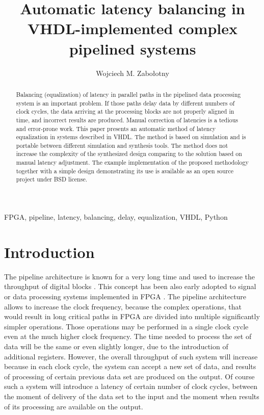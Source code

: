 \documentclass[preprint,11pt]{elsarticle}
\newcommand{\wzcite}[1]{ \cite{#1}}
\begin{document}
\sloppy
\begin{frontmatter}
\title{Automatic latency balancing in VHDL-implemented complex pipelined systems}
\author{Wojciech M. Zabołotny}
\address{Institute of Electronic Systems, Warsaw University of Technology,
 ul. Nowowiejska 15/19, 00-665 Warszawa, Poland}
 \begin{abstract}
 Balancing (equalization) of latency in parallel paths in the pipelined data processing system is an important problem.
 If those paths delay data by different numbers of clock cycles, the data arriving at the processing blocks 
 are not properly aligned in time, and incorrect results are produced. Manual correction of latencies is
 a tedious and error-prone work. This paper presents an automatic method of
 latency equalization in systems described in VHDL.
 The method is based on simulation and is portable between different simulation
 and synthesis tools. The method does not increase the complexity of the synthesized design
 comparing to the solution based on manual latency adjustment.
 The example implementation of the proposed methodology together with a simple design
 demonstrating its use is available as an open source project under BSD license.
 \end{abstract}
\begin{keyword}
FPGA, pipeline, latency, balancing, delay, equalization, VHDL, Python
\end{keyword}
\end{frontmatter}
 \section{Introduction}
 The pipeline architecture is known for a very long time and used to increase
 the throughput of digital blocks\wzcite{Hallin1972880}. This concept has been also
 early adopted to signal or data processing systems implemented in FPGA\wzcite{614780}.
 The pipeline architecture allows to increase the clock frequency, because the complex
 operations, that would result in long critical paths in FPGA are divided into multiple
 significantly simpler operations. Those operations may be performed 
 in a single clock cycle even at the much higher clock frequency.
 The time needed to process the set of data will be the same or even slightly 
 longer, due to the introduction of additional registers.
However, the overall throughput of such system will increase because in each clock cycle,
 the system can accept a new set of data, and results of processing of certain previous
 data set are produced on the output.
 Of course such a system will introduce a latency of certain number of clock cycles,
 between the moment of delivery of the data set to the input and the moment when results 
 of its processing are available on the output.
\end{document}
